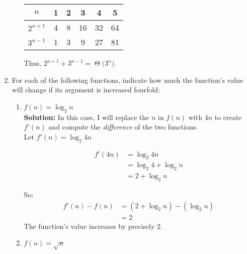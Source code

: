 \documentclass[11pts]{article}
\newcommand{\BigTheta}[1]{\ensuremath{\operatorname{\Theta}\bigl(#1\bigr)}}
\begin{document}
\begin{enumerate}
\begin{enumerate}
        \begin{center}
        \begin{tabular}{| c || c | c | c | c | c |}
          \hline
          $n$ & 1 & 2 & 3 & 4 & 5 \\
          \hline \hline
          $2^{n+1}$ & 4 & 8 & 16 & 32 & 64 \\
          \hline
          $3^{n-1}$ & 1 & 3 & 9 & 27 & 81 \\
          \hline
        \end{tabular}
        \end{center}
        \newline
        Thus, $ 2^{n+1}+3^{n-1} = \BigTheta{3^n}$.
      \\
    \end{enumerate}
    \newpage

  \item
  For each of the following functions, indicate how much the
  function’s value will change if its argument is increased fourfold:

    \begin{enumerate}
    \item $ f(n)=\log_2{n} $ \\

    \textbf{Solution:} In this case, I will replace the $n$ in $f(n)$ with
    $4n$ to create $f'(n)$ and compute the \emph{difference} of the two
    functions.\\
    Let $f'(n) = \log_2{4n}$

    \begin{align*}
    f'(4n) &= \log_2{4n}            \\
           &= \log_2{4} + \log_2{n} \\
           &= 2 + \log_2{n}
    \end{align*}

    So: 
    \begin{align*}
    f'(n) - f(n) &= (2 + \log_2{n}) - (\log_2{n}) \\
                 &= 2
    \end{align*}
    The function's value increases by precisely $2$. \\

    \item $ f(n)=\sqrt{n} $ \\


\end{enumerate}
\end{enumerate}
\end{document}
